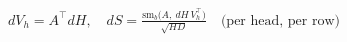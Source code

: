 \documentclass{article}
\begin{document}
\begin{preview}
$\displaystyle dV_h = A^{\top} dH,\quad dS = \frac{\mathrm{sm}_b\bigl(A,\ dH\,V_h^{\top}\bigr)}{\sqrt{HD}}\quad\text{(per head, per row)}$
\end{preview}
\end{document}
